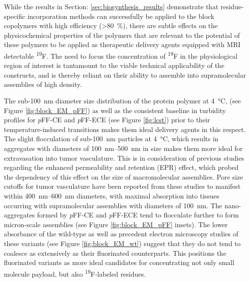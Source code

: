 \begin{refsection}
While the results in Section: \ref{sec:biosynthesis_results} demonstrate that
residue-specific incorporation methods can successfully be applied to the block
copolymers with high efficiency (\textgreater \SI{80}{\percent}), there are
subtle effects on the physicochemical properties of the polymers that are
relevant to the potential of these polymers to be applied as therapeutic
delivery agents equipped with MRI detectable \textsuperscript{19}F. The need to
focus the concentration of \textsuperscript{19}F in the physiological region of
interest is tantamount to the viable technical applicability of the constructs,
and is thereby reliant on their ability to assemble into supramolecular
assemblies of high density.

The sub-\SI{100}{\nm} diameter size distribution of the protein polymer at
\SI{4}{\celsius}, (see Figure \ref{fig:block_EM_pFF}) as well as the consistent
baseline in turbidity profiles for \emph{p}FF-CE and \emph{p}FF-ECE (see Figure
\ref{fig:lcst}) prior to their temperature-induced transitions makes them ideal
delivery agents in this respect. The slight flocculation of sub-\SI{100}{\nm}
particles at \SI{4}{\celsius}, which results in aggregates with diameters of
\SIrange{100}{500}{\nm} in size makes them more ideal for extravasation into
tumor vasculature. This is in consideration of previous studies regarding the
enhanced permeability and retention (EPR) effect, which probed the dependency of
this effect on the size of macromolecular assemblies. Pore size cutoffs for
tumor vasculature have been reported from these studies to manifest within
\SIrange{400}{600}{\nm} diameters,\cite{Yuan1995} with maximal absorption into
tissues occurring with supramolecular assemblies with diameters of
\SI{100}{\nm}.\cite{Charrois2003} The nano-aggregates formed by \emph{p}FF-CE
and \emph{p}FF-ECE tend to flocculate further to form micron-scale assemblies
(see Figure \ref{fig:block_EM_pFF} insets). The lower absorbance of the
wild-type as well as precedent electron microscopy studies of these variants
(see Figure \ref{fig:block_EM_wt}) suggest that they do not tend to coalesce as
extensively as their fluorinated counterparts. This positions the fluorinated
variants as more ideal candidates for concentrating not only small molecule
payload, but also \textsuperscript{19}F-labeled residues.


\end{refsection}
